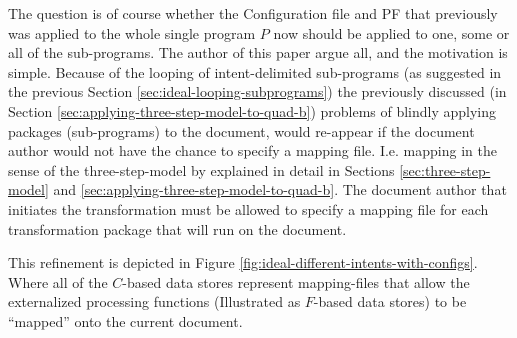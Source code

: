 \documentclass{scrreprt}
\begin{document}
The question is of course whether the Configuration file and PF that previously was applied to the whole single program $P$ now should be applied to one, some or all of the sub-programs. The author of this paper argue all, and the motivation is simple. Because of the looping of intent-delimited sub-programs (as suggested in the previous Section \ref{sec:ideal-looping-subprograms}) the previously discussed (in Section \ref{sec:applying-three-step-model-to-quad-b}) problems of blindly applying packages (sub-programs) to the document, would re-appear if the document author would not have the chance to specify a mapping file. I.e. mapping in the sense of the three-step-model by \citet{goldfarb} explained in detail in Sections \ref{sec:three-step-model} and \ref{sec:applying-three-step-model-to-quad-b}. The document author that initiates the transformation must be allowed to specify a mapping file for each transformation package that will run on the document.

This refinement is depicted in Figure \ref{fig:ideal-different-intents-with-configs}. Where all of the $C$-based data stores represent mapping-files that allow the externalized processing functions (Illustrated as $F$-based data stores) to be ``mapped'' onto the current document.
\end{document}
